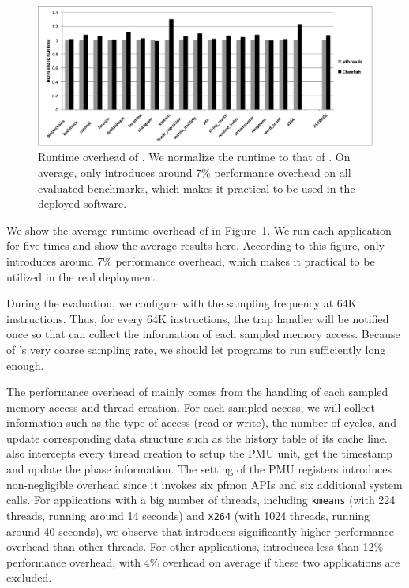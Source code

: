 \begin{figure}[htbp]
\centering
\label{fig:overhead}
\includegraphics[width=2\columnwidth]{figure/Overhead.pdf}
\caption{Runtime overhead of \Cheetah{}. We normalize the runtime to that of \pthreads{}. On average, \cheetah{} only introduces around 7\% performance overhead on all evaluated benchmarks, which makes it practical to be used in the deployed software. }
\end{figure}

We show the average runtime overhead of \cheetah{} in Figure~\ref{fig:overhead}. We run each application for five times and show the average results here. According to this figure, \cheetah{} only introduces around 7\% performance overhead, which makes it practical to be utilized in the real deployment. 

During the evaluation, we configure \cheetah{} with the sampling frequency at 64K instructions. Thus, for every 64K instructions, the trap handler will be notified once so that \cheetah{} can collect the information of each sampled memory access. Because of \cheetah{}'s very coarse sampling rate, we should let programs to run sufficiently long enough. 

The performance overhead of \cheetah{} mainly comes from the handling of each sampled memory access and thread creation. For each sampled access, we will collect information such as the type of access (read or write), the number of cycles, and update corresponding data structure such as the history table of its cache line. \cheetah{} also intercepts every thread creation to setup the PMU unit, get the timestamp and update the phase information. The setting of the PMU registers introduces non-negligible overhead since it invokes six pfmon APIs and six additional system calls. For applications with a big number of threads, including \texttt{kmeans} (with 224 threads, running around 14 seconds) and \texttt{x264} (with 1024 threads, running around 40 seconds), we observe that \cheetah{} introduces significantly higher performance overhead than other threads. For other applications, \cheetah{} introduces less than 12\% performance overhead, with 4\% overhead on average if these two applications are excluded.  

